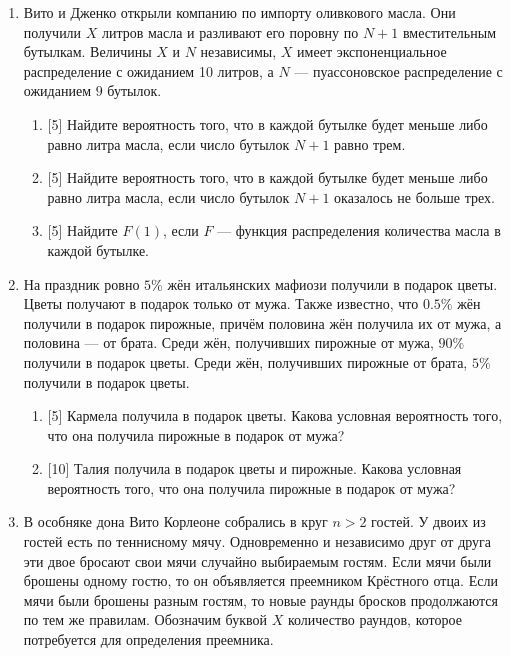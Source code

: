   
  \begin{enumerate}
  \item Вито и Дженко открыли компанию по импорту оливкового масла. 
  Они получили $X$ литров масла и разливают его поровну по $N+1$ вместительным бутылкам. 
  Величины $X$ и $N$ независимы, $X$ имеет экспоненциальное распределение с ожиданием 10 литров,
  а $N$ — пуассоновское распределение с ожиданием $9$ бутылок. 
  
  \begin{enumerate}
      \item {[5]} Найдите вероятность того, что в каждой бутылке будет меньше либо равно литра масла,
      если число бутылок $N + 1$ равно трем.
      \item {[5]} Найдите вероятность того, что в каждой бутылке будет меньше либо равно литра масла, 
      если число бутылок $N + 1$ оказалось не больше трех. 
      \item {[5]} Найдите $F(1)$, если $F$ — функция распределения количества масла в каждой бутылке.
  \end{enumerate}
  
  
  \item На праздник ровно $5\%$ жён итальянских мафиози получили в подарок цветы. 
  Цветы получают в подарок только от мужа. 
  Также известно, что $0.5\%$ жён получили в подарок пирожные,
  причём половина жён получила их от мужа, а половина — от брата.
  Среди жён, получивших пирожные от мужа, $90\%$ получили в подарок цветы. 
  Среди жён, получивших пирожные от брата, $5\%$ получили в подарок цветы.
  
  \begin{enumerate}
      \item {[5]} Кармела получила в подарок цветы. 
      Какова условная вероятность того, что она получила пирожные в подарок от мужа?
      \item {[10]} Талия получила в подарок цветы и пирожные. 
      Какова условная вероятность того, что она получила пирожные в подарок от мужа?
  \end{enumerate}
  
  
  \item В особняке дона Вито Корлеоне собрались в круг $n>2$ гостей. 
  У двоих из гостей есть по теннисному мячу. 
  Одновременно и независимо друг от друга эти двое бросают свои мячи случайно выбираемым гостям. 
  Если мячи были брошены одному гостю, то он объявляется преемником Крёстного отца. 
  Если мячи были брошены разным гостям, то новые раунды бросков продолжаются по тем же правилам. 
  Обозначим буквой $X$ количество раундов, которое потребуется для определения преемника. 
  

\end{enumerate}
